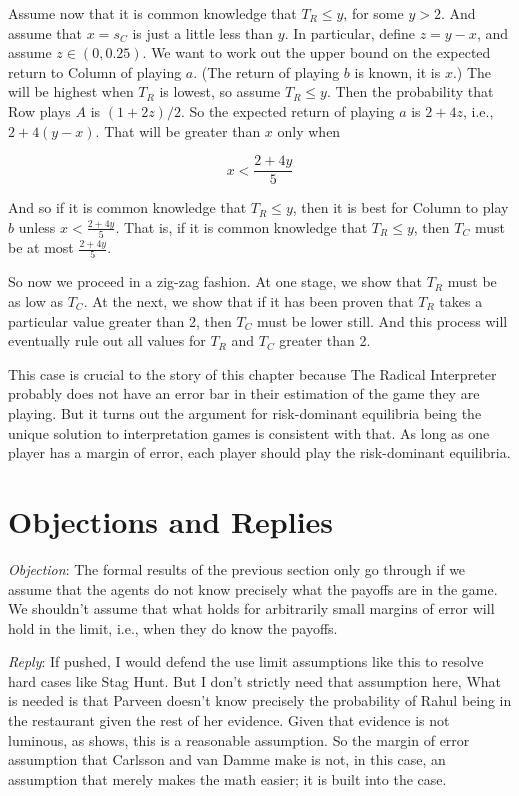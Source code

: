 \documentclass[11pt,]{book}
\begin{document}
Assume now that it is common knowledge that \(T_R \leq y\), for some \(y > 2\). And assume that \(x = s_C\) is just a little less than \(y\). In particular, define \(z = y -x\), and assume \(z \in (0, 0.25)\). We want to work out the upper bound on the expected return to Column of playing \(a\). (The return of playing \(b\) is known, it is \(x\).) The will be highest when \(T_R\) is lowest, so assume \(T_R \leq y\). Then the probability that Row plays \(A\) is \((1 + 2z)/2\). So the expected return of playing \(a\) is \(2 + 4z\), i.e., \(2 + 4(y - x)\). That will be greater than \(x\) only when

\[x < \frac{2 + 4y}{5}\]

And so if it is common knowledge that \(T_R \leq y\), then it is best for Column to play \(b\) unless \(x < \frac{2 + 4y}{5}\). That is, if it is common knowledge that \(T_R \leq y\), then \(T_C\) must be at most \(\frac{2 + 4y}{5}\).

So now we proceed in a zig-zag fashion. At one stage, we show that \(T_R\) must be as low as \(T_C\). At the next, we show that if it has been proven that \(T_R\) takes a particular value greater than 2, then \(T_C\) must be lower still. And this process will eventually rule out all values for \(T_R\) and \(T_C\) greater than 2.

This case is crucial to the story of this chapter because The Radical Interpreter probably does not have an error bar in their estimation of the game they are playing. But it turns out the argument for risk-dominant equilibria being the unique solution to interpretation games is consistent with that. As long as one player has a margin of error, each player should play the risk-dominant equilibria.

\hypertarget{evsolution}{%
\section{Objections and Replies}\label{evsolution}}

\emph{Objection}: The formal results of the previous section only go through if we assume that the agents do not know precisely what the payoffs are in the game. We shouldn't assume that what holds for arbitrarily small margins of error will hold in the limit, i.e., when they do know the payoffs.

\emph{Reply}: If pushed, I would defend the use limit assumptions like this to resolve hard cases like Stag Hunt. But I don't strictly need that assumption here, What is needed is that Parveen doesn't know precisely the probability of Rahul being in the restaurant given the rest of her evidence. Given that evidence is not luminous, as \citet{Williamson2000} shows, this is a reasonable assumption. So the margin of error assumption that Carlsson and van Damme make is not, in this case, an assumption that merely makes the math easier; it is built into the case.
\end{document}
